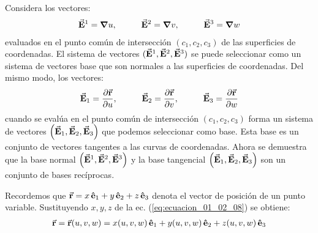 \documentclass[hidelinks,12pt]{article}
\begin{document}
Considera los vectores:
\begin{align}
\va{E}^{1} = \grad{u}, \hspace{1cm} \va{E}^{2} = \grad{v}, \hspace{1cm} \va{E}^{3} = \grad{w}
\label{eq:ecuacion_01_02_12}
\end{align}
evaluados en el punto común de intersección $(c_{1}, c_{2}, c_{3})$ de las superficies de coordenadas. El sistema de vectores $(\va{E}^{1}, \va{E}^{2}, \va{E}^{3})$ se puede seleccionar como un sistema de vectores base que son normales a las superficies de coordenadas. Del mismo modo, los vectores:
\begin{align}
\va{E}_{1} = \pdv{\va{r}}{u}, \hspace{1cm} \va{E}_{2} = \pdv{\va{r}}{v}, \hspace{1cm} \va{E}_{3} = \pdv{\va{r}}{w}
\label{ec:ecuacion_01_02_13}
\end{align}
cuando se evalúa en el punto común de intersección $(c_{1}, c_{2}, c_{3})$ forma un sistema de vectores $\left( \va{E}_{1}, \va{E}_{2}, \va{E}_{3} \right)$ que podemos seleccionar como base. Esta base es un conjunto de vectores tangentes a las curvas de coordenadas. Ahora se demuestra que la base normal $\left( \va{E}^{1}, \va{E}^{2}, \va{E}^{3} \right)$ y la base tangencial $\left( \va{E}_{1}, \va{E}_{2}, \va{E}_{3} \right)$ son un conjunto de bases recíprocas.
\par
Recordemos que $\va{r} = x \, \vu{e}_{1} + y \, \vu{e}_{2} + z \, \vu{e}_{3}$ denota el vector de posición de un punto variable. Sustituyendo $x, y, z$ de la ec. (\ref{eq:ecuacion_01_02_08}) se obtiene:
\begin{align}
\va{r} = \va{r} (u, v, w) = x (u, v, w) \, \vu{e}_{1} + y (u, v, w) \, \vu{e}_{2} + z (u, v, w) \, \vu{e}_{3}
\label{eq:ecuacion_01_02_14}
\end{align}
\end{document}
